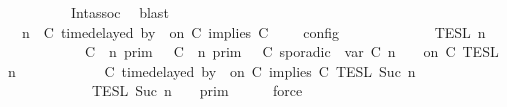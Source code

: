 \begin{isabellebody}
\ \ \ \ \ \ \ \ \ \ Int{\isacharunderscore}assoc\ \isamarkupfalse%
\ blast\isanewline
\ \ \isamarkupfalse%
\ \isamarkupfalse%
\ {\isacartoucheopen}{\isasymlbrakk}\ {\isasymGamma}{\isacharcomma}\ n\ {\isasymturnstile}\ {\isacharparenleft}C\ time{\isacharminus}delayed{\isasymbowtie}\ by\ {\isasymdelta}{\isasymtau}\ on\ C\ implies\ C\ {\isacharhash}\ {\isasymPsi}\ {\isasymtriangleright}\ {\isasymPhi}\ {\isasymrbrakk}\isactrlsub c\isactrlsub o\isactrlsub n\isactrlsub f\isactrlsub i\isactrlsub g\isanewline
\ \ \ \ \ \ \ \ \ \ {\isacharequal}\ {\isasymlbrakk}{\isasymlbrakk}\ {\isasymPsi}\ {\isasymrbrakk}{\isasymrbrakk}\isactrlsub T\isactrlsub E\isactrlsub S\isactrlsub L\isactrlbsup {\isasymge}\ n\isactrlesup \isanewline
\ \ \ \ \ \ \ \ \ \ {\isasyminter}\ {\isacharparenleft}{\isasymlbrakk}\ C\ {\isasymnot}{\isasymUp}\ n\ {\isasymrbrakk}\isactrlsub p\isactrlsub r\isactrlsub i\isactrlsub m\ {\isasymunion}\ {\isasymlbrakk}\ C\ {\isasymUp}\ n\ {\isasymrbrakk}\isactrlsub p\isactrlsub r\isactrlsub i\isactrlsub m\ {\isasyminter}\ {\isasymlbrakk}\ C\ sporadic{\isasymsharp}\ {\isasymlparr}\ {\isasymtau}\isactrlsub v\isactrlsub a\isactrlsub r\ {\isacharparenleft}C\ n{\isacharparenright}\ {\isasymoplus}\ {\isasymdelta}{\isasymtau}\ {\isasymrparr}\ on\ C\ {\isasymrbrakk}\isactrlsub T\isactrlsub E\isactrlsub S\isactrlsub L\isactrlbsup {\isasymge}\ n\isactrlesup {\isacharparenright}\isanewline
\ \ \ \ \ \ \ \ \ \ {\isasyminter}\ {\isasymlbrakk}\ C\ time{\isacharminus}delayed{\isasymbowtie}\ by\ {\isasymdelta}{\isasymtau}\ on\ C\ implies\ C\ {\isasymrbrakk}\isactrlsub T\isactrlsub E\isactrlsub S\isactrlsub L\isactrlbsup {\isasymge}\ Suc\ n\isactrlesup \isanewline
\ \ \ \ \ \ \ \ \ \ {\isasyminter}\ {\isacharparenleft}{\isasymlbrakk}{\isasymlbrakk}\ {\isasymPhi}\ {\isasymrbrakk}{\isasymrbrakk}\isactrlsub T\isactrlsub E\isactrlsub S\isactrlsub L\isactrlbsup {\isasymge}\ Suc\ n\isactrlesup \ {\isasyminter}\ {\isasymlbrakk}{\isasymlbrakk}\ {\isasymGamma}\ {\isasymrbrakk}{\isasymrbrakk}\isactrlsub p\isactrlsub r\isactrlsub i\isactrlsub m{\isacharparenright}{\isacartoucheclose}\isanewline
\ \ \ \ \isamarkupfalse%
\ force\isanewline
\ \ \isamarkupfalse%
\ \isamarkupfalse%

\end{isabellebody}
